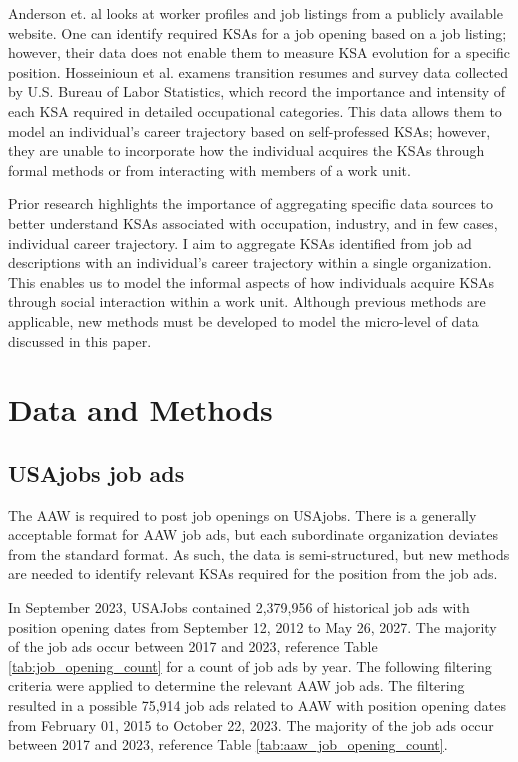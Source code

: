 \documentclass[12pt]{article}
\begin{document}
Anderson et. al looks at worker profiles and job listings from a publicly available website.\cite{anderson2017skill} One can identify required KSAs for a job opening based on a job listing; however, their data does not enable them to measure KSA evolution for a specific position. Hosseinioun et al. examens transition resumes and survey data collected by U.S. Bureau of Labor Statistics, which record the importance and intensity of each KSA required in detailed occupational categories.\cite{nested_skills} This data allows them to model an individual's career trajectory based on self-professed KSAs; however, they are unable to incorporate how the individual acquires the KSAs through formal methods or from interacting with members of a work unit.

Prior research highlights the importance of aggregating specific data sources to better understand KSAs associated with occupation, industry, and in few cases, individual career trajectory. I aim to aggregate KSAs identified from job ad descriptions with an individual's career trajectory within a single organization. This enables us to model the informal aspects of how individuals acquire KSAs through social interaction within a work unit. Although previous methods are applicable, new methods must be developed to model the micro-level of data discussed in this paper.

\section{Data and Methods}

\subsection{USAjobs job ads}

The AAW is required to post job openings on USAjobs. There is a generally acceptable format for AAW job ads, but each subordinate organization deviates from the standard format. As such, the data is semi-structured, but new methods are needed to identify relevant KSAs required for the position from the job ads. 

In September 2023, USAJobs contained 2,379,956 of historical job ads with position opening dates from September 12, 2012 to May 26, 2027. The majority of the job ads occur between 2017 and 2023, reference Table \ref{tab:job_opening_count} for a count of job ads by year. The following filtering criteria were applied to determine the relevant AAW job ads. The filtering resulted in a possible 75,914 job ads related to AAW with position opening dates from February 01, 2015 to October 22, 2023. The majority of the job ads occur between 2017 and 2023, reference Table \ref{tab:aaw_job_opening_count}. 
\end{document}
